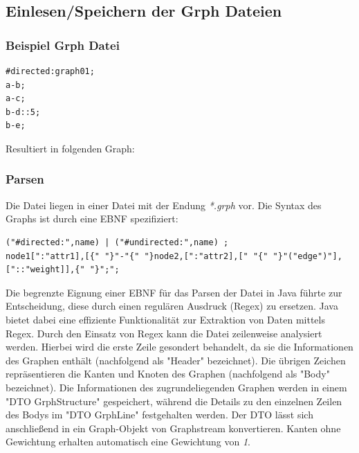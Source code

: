 \subsection{Einlesen/Speichern der Grph Dateien}
\label{sec:syntax-grph}

\subsubsection{Beispiel Grph Datei}
\begin{verbatim}
#directed:graph01;
a-b;
a-c;
b-d::5;
b-e;
\end{verbatim}
Resultiert in folgenden Graph:\newline
{}

\subsubsection{Parsen}
Die Datei liegen in einer Datei mit der Endung \textit{*.grph} vor. Die Syntax des Graphs ist durch eine EBNF spezifiziert:
\begin{verbatim}
("#directed:",name) | ("#undirected:",name) ;
node1[":"attr1],[{" "}"-"{" "}node2,[":"attr2],[" "{" "}"("edge")"],["::"weight]],{" "}";";
\end{verbatim}
Die begrenzte Eignung einer EBNF für das Parsen der Datei in Java führte zur Entscheidung, diese durch einen regulären Ausdruck (Regex) zu ersetzen. Java bietet dabei eine effiziente Funktionalität zur Extraktion von Daten mittels Regex.
\newline \newline
Durch den Einsatz von Regex kann die Datei zeilenweise analysiert werden. Hierbei wird die erste Zeile gesondert behandelt, da sie die Informationen des Graphen enthält (nachfolgend als "Header" bezeichnet). Die übrigen Zeichen repräsentieren die Kanten und Knoten des Graphen (nachfolgend als "Body" bezeichnet). Die Informationen des zugrundeliegenden Graphen werden in einem "DTO GrphStructure" gespeichert, während die Details zu den einzelnen Zeilen des Bodys im "DTO GrphLine" festgehalten werden. Der DTO lässt sich anschließend in ein Graph-Objekt von Graphstream konvertieren. Kanten ohne Gewichtung erhalten automatisch eine Gewichtung von \textit{1}.

